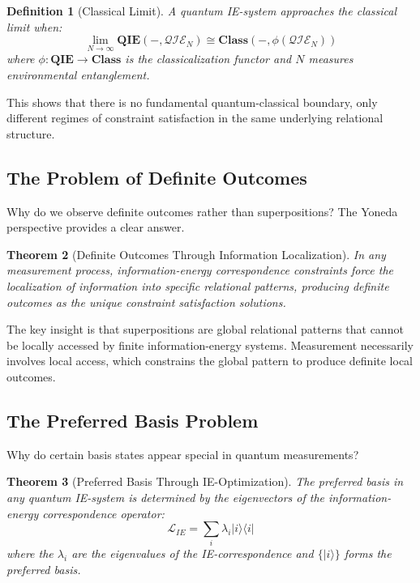 \documentclass[12pt,a4paper]{article}
\newtheorem{theorem}{Theorem}[section]
\newtheorem{definition}[theorem]{Definition}
\begin{document}
\begin{definition}[Classical Limit]
A quantum IE-system approaches the classical limit when:
\[
\lim_{N \to \infty} \mathbf{QIE}(-, \mathcal{QIE}_N) \cong \mathbf{Class}(-, \phi(\mathcal{QIE}_N))
\]
where $\phi: \mathbf{QIE} \to \mathbf{Class}$ is the classicalization functor and $N$ measures environmental entanglement.
\end{definition}

This shows that there is no fundamental quantum-classical boundary, only different regimes of constraint satisfaction in the same underlying relational structure.

\subsection{The Problem of Definite Outcomes}

Why do we observe definite outcomes rather than superpositions? The Yoneda perspective provides a clear answer.

\begin{theorem}[Definite Outcomes Through Information Localization]
In any measurement process, information-energy correspondence constraints force the localization of information into specific relational patterns, producing definite outcomes as the unique constraint satisfaction solutions.
\end{theorem}

The key insight is that superpositions are global relational patterns that cannot be locally accessed by finite information-energy systems. Measurement necessarily involves local access, which constrains the global pattern to produce definite local outcomes.

\subsection{The Preferred Basis Problem}

Why do certain basis states appear special in quantum measurements? 

\begin{theorem}[Preferred Basis Through IE-Optimization]
The preferred basis in any quantum IE-system is determined by the eigenvectors of the information-energy correspondence operator:
\[
\mathcal{L}_{IE} = \sum_i \lambda_i |i\rangle\langle i|
\]
where the $\lambda_i$ are the eigenvalues of the IE-correspondence and $\{|i\rangle\}$ forms the preferred basis.
\end{theorem}
\end{document}
